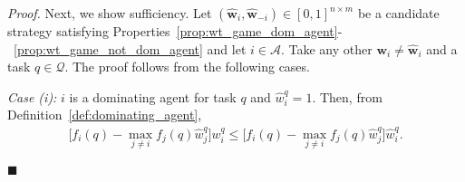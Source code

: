 \documentclass{IEEEtran}
\newcommand{\ldef}{:=}
\newcommand{\Mcal}[1]{\mathcal{#1}}
\newcommand{\Mc}[1]{\mathcal{#1}}
\newcommand{\bld}[1]{\mathbf{#1}}
\newcommand{\squaresym}{\hbox{$\blacksquare$}}
\newcommand{\proofend}{\relax\ifmmode\else\unskip\hfill\fi\squaresym}
\renewenvironment{proof}{\textit{Proof.} }{\proofend}
\renewcommand{\hat}[1]{\widehat{#1}}
\newcommand{\marginn}[1]{\marginpar{\color{blue}\tiny\ttfamily#1}}
\newcommand{\margin}[1]{\marginpar{\color{magenta}\tiny\ttfamily#1}}
\def \agt{\Mcal{A}}
\def \tsk{\Mc{Q}}
\def \w{\bld{w}}
\def \wh{\hat{\w}}
\def \what{\hat{w}}
\begin{document}
\begin{proof}
Next, we show sufficiency. Let
$(\hat{\w}_i,\hat{\w}_{-i}) \in [0,1]^{n \times m}$
be a candidate strategy satisfying
Properties~\ref{prop:wt_game_dom_agent}-~\ref{prop:wt_game_not_dom_agent}
and let $i \in \agt$. Take any other $\w_i \neq \wh_i$ and a task
$q \in \tsk$. The proof follows from the following cases. 

  \emph{Case (i):} $i$ is a dominating agent for task $q$ and $\what^q_i = 1$. Then, from Definition~\ref{def:dominating_agent},
\begin{align*}
	\Big[f_i(q) - \max_{j \neq i} f_j(q)\what^q_j \Big]w^q_i \leq \Big[ f_i(q) - \max_{j \neq i} f_j(q)\what^q_j \Big] \what^q_i.
\end{align*}
	


\end{proof}
\end{document}
